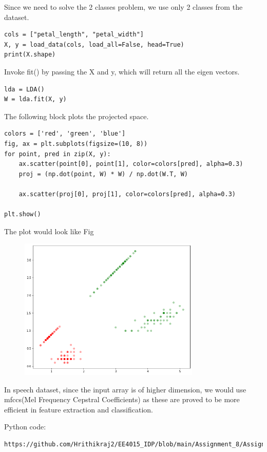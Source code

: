 \documentclass[journal,12pt,twocolumn]{IEEEtran}
\begin{document}
Since we need to solve the 2 classes problem, we use only 2 classes from the dataset.
\begin{lstlisting}
cols = ["petal_length", "petal_width"]
X, y = load_data(cols, load_all=False, head=True)
print(X.shape)
\end{lstlisting}
Invoke fit() by passing the X and y, which will return all the eigen vectors.
\begin{lstlisting}
lda = LDA()
W = lda.fit(X, y)
\end{lstlisting}
The following block plots the projected space.
\begin{lstlisting}
colors = ['red', 'green', 'blue']
fig, ax = plt.subplots(figsize=(10, 8))
for point, pred in zip(X, y):
    ax.scatter(point[0], point[1], color=colors[pred], alpha=0.3)
    proj = (np.dot(point, W) * W) / np.dot(W.T, W)
 
    ax.scatter(proj[0], proj[1], color=colors[pred], alpha=0.3)
 
plt.show()
\end{lstlisting}
The plot would look like Fig 
\begin{figure}[!h]
\begin{center}
\includegraphics[width=3.4in]{figs/fig1.png}
\end{center}
\caption{}
\label{fig:1}
\end{figure}

In speech dataset, since the input array is of higher dimension, we would use mfccs(Mel Frequency Cepstral Coefficients) as these are proved to be more efficient in feature extraction and classification.

Python code:
\begin{lstlisting}
https://github.com/Hrithikraj2/EE4015_IDP/blob/main/Assignment_8/Assignment_8.ipynb
\end{lstlisting}
\end{document}
